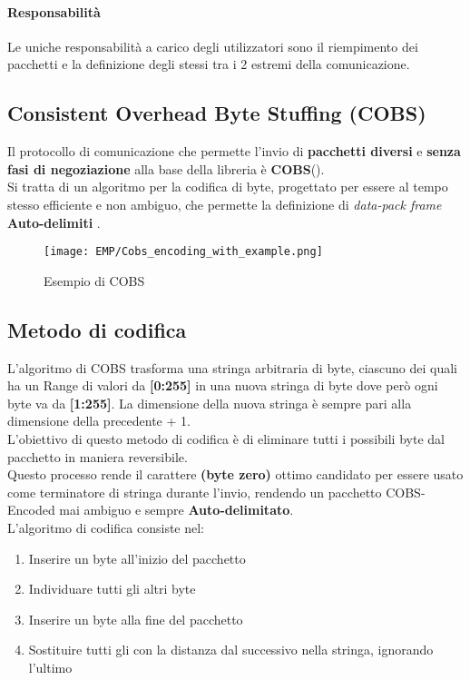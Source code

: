 \paragraph{Responsabilità} Le uniche responsabilità a carico degli utilizzatori sono il riempimento dei pacchetti e la definizione degli stessi tra i 2 estremi della comunicazione.

\subsection*{Consistent Overhead Byte Stuffing (COBS)}
Il protocollo di comunicazione che permette l’invio di \textbf{pacchetti diversi} e \textbf{senza fasi di negoziazione} alla base della libreria è \textbf{COBS}(\cite{COBS}).\\
Si tratta di un algoritmo per la codifica di byte, progettato per essere al tempo stesso efficiente e non ambiguo, che permette la definizione di \textit{data-pack frame} \textbf{Auto-delimiti} .

\begin{figure}[h]
	\centering
	\texttt{[image: EMP/Cobs\_encoding\_with\_example.png]}
	\caption[Esempio di COBS]{Esempio di COBS}
\end{figure}

\subsection{Metodo di codifica}
L'algoritmo di COBS trasforma una stringa arbitraria di byte, ciascuno dei quali ha un Range di valori da \textbf{[0:255]} in una nuova stringa di byte dove però ogni byte va da \textbf{[{\color{red}1}:255]}. La dimensione della nuova stringa è sempre pari alla dimensione della precedente + 1.\\
L'obiettivo di questo metodo di codifica è di eliminare tutti i possibili byte \zeroByte dal pacchetto in maniera reversibile.\\
Questo processo rende il carattere \textbf{\zeroByte (byte zero)} ottimo candidato per essere usato come terminatore di stringa durante l'invio, rendendo un pacchetto COBS-Encoded mai ambiguo e sempre \textbf{Auto-delimitato}.\\
L'algoritmo di codifica consiste nel:
\begin{enumerate} [itemsep=-3mm]
	\item Inserire un byte \zeroByte all'inizio del pacchetto
	\item Individuare tutti gli altri byte \zeroByte
	\item Inserire un byte \zeroByte alla fine del pacchetto
	\item Sostituire tutti gli \zeroByte con la distanza dal successivo \zeroByte nella stringa, ignorando l'ultimo
\end{enumerate}

